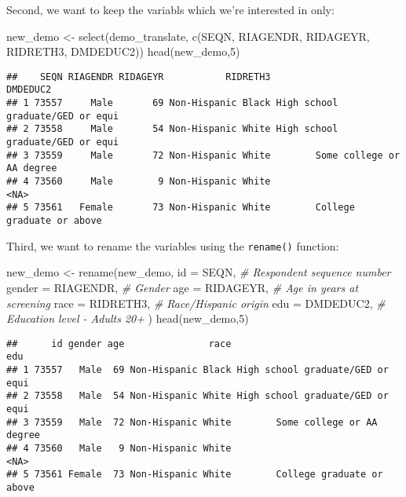 \documentclass[
]{book}
\newenvironment{Shaded}{\begin{snugshade}}{\end{snugshade}}
\newcommand{\AttributeTok}[1]{\textcolor[rgb]{0.77,0.63,0.00}{#1}}
\newcommand{\CommentTok}[1]{\textcolor[rgb]{0.56,0.35,0.01}{\textit{#1}}}
\newcommand{\DecValTok}[1]{\textcolor[rgb]{0.00,0.00,0.81}{#1}}
\newcommand{\FunctionTok}[1]{\textcolor[rgb]{0.00,0.00,0.00}{#1}}
\newcommand{\NormalTok}[1]{#1}
\newcommand{\OtherTok}[1]{\textcolor[rgb]{0.56,0.35,0.01}{#1}}
\begin{document}
Second, we want to keep the variabls which we're interested in only:

\begin{Shaded}
\begin{Highlighting}[]
\NormalTok{new\_demo }\OtherTok{\textless{}{-}} \FunctionTok{select}\NormalTok{(demo\_translate,}
                   \FunctionTok{c}\NormalTok{(SEQN,}
\NormalTok{                    RIAGENDR,}
\NormalTok{                    RIDAGEYR,}
\NormalTok{                    RIDRETH3,}
\NormalTok{                    DMDEDUC2))}
\FunctionTok{head}\NormalTok{(new\_demo,}\DecValTok{5}\NormalTok{)}
\end{Highlighting}
\end{Shaded}

\begin{verbatim}
##    SEQN RIAGENDR RIDAGEYR           RIDRETH3                         DMDEDUC2
## 1 73557     Male       69 Non-Hispanic Black High school graduate/GED or equi
## 2 73558     Male       54 Non-Hispanic White High school graduate/GED or equi
## 3 73559     Male       72 Non-Hispanic White        Some college or AA degree
## 4 73560     Male        9 Non-Hispanic White                             <NA>
## 5 73561   Female       73 Non-Hispanic White        College graduate or above
\end{verbatim}

Third, we want to rename the variables using the \texttt{rename()} function:

\begin{Shaded}
\begin{Highlighting}[]
\NormalTok{new\_demo }\OtherTok{\textless{}{-}} \FunctionTok{rename}\NormalTok{(new\_demo,}
       \AttributeTok{id =}\NormalTok{ SEQN, }\CommentTok{\# Respondent sequence number}
       \AttributeTok{gender =}\NormalTok{ RIAGENDR, }\CommentTok{\# Gender}
       \AttributeTok{age =}\NormalTok{ RIDAGEYR, }\CommentTok{\# Age in years at screening}
       \AttributeTok{race =}\NormalTok{ RIDRETH3, }\CommentTok{\# Race/Hispanic origin}
       \AttributeTok{edu =}\NormalTok{ DMDEDUC2, }\CommentTok{\# Education level {-} Adults 20+}
\NormalTok{       )}
\FunctionTok{head}\NormalTok{(new\_demo,}\DecValTok{5}\NormalTok{)}
\end{Highlighting}
\end{Shaded}

\begin{verbatim}
##      id gender age               race                              edu
## 1 73557   Male  69 Non-Hispanic Black High school graduate/GED or equi
## 2 73558   Male  54 Non-Hispanic White High school graduate/GED or equi
## 3 73559   Male  72 Non-Hispanic White        Some college or AA degree
## 4 73560   Male   9 Non-Hispanic White                             <NA>
## 5 73561 Female  73 Non-Hispanic White        College graduate or above
\end{verbatim}
\end{document}
